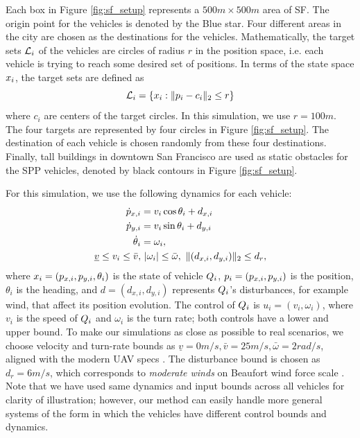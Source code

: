 Each box in Figure \ref{fig:sf_setup} represents a $500m \times 500m$ area of SF. The origin point for the vehicles is denoted by the Blue star. Four different areas in the city are chosen as the destinations for the vehicles. Mathematically, the target sets $\mathcal{L}_i$ of the vehicles are circles of radius $r$ in the position space, i.e. each vehicle is trying to reach some desired set of positions. In terms of the state space $x_i$, the target sets are defined as
\begin{equation}
\label{eq:target_sim}
\targetset_i = \{\state_i: \|\pos_i - c_i\|_2 \le r\}
\end{equation}
\noindent where $c_i$ are centers of the target circles. In this simulation, we use $r = 100m$. The four targets are represented by four circles in Figure \ref{fig:sf_setup}. The destination of each vehicle is chosen randomly from these four destinations. Finally, tall buildings in downtown San Francisco are used as static obstacles for the SPP vehicles, denoted by black contours in Figure \ref{fig:sf_setup}.

For this simulation, we use the following dynamics for each vehicle:
\begin{equation}
\label{eq:dyn_i}
\begin{aligned}
\dot{\pos}_{x,i} &= v_i \cos \theta_i + d_{x,i} \\
\dot{\pos}_{y,i} &= v_i \sin \theta_i + d_{y,i}\\
\dot{\theta}_i &= \omega_i, \\
\underline{v} \le v_i \le \bar{v}, & ~|\omega_i| \le \bar{\omega}, ~\|(d_{x,i}, d_{y,i}) \|_2 \le d_{r},
\end{aligned}
\end{equation}
\noindent where $x_i = (p_{x,i}, p_{y,i}, \theta_i)$ is the state of vehicle $Q_i$, $p_i = (p_{x,i}, p_{y,i})$ is the position, $\theta_i$ is the heading, and $d = (d_{x,i}, d_{y,i})$ represents $Q_i$'s disturbances, for example wind, that affect its position evolution. The control of $Q_i$ is $u_i = (v_i, \omega_i)$, where $v_i$ is the speed of $Q_i$ and $\omega_i$ is the turn rate; both controls have a lower and upper bound. To make our simulations as close as possible to real scenarios, we choose velocity and turn-rate bounds as $\underline{v} = 0m/s, \bar{v} = 25m/s, \bar\omega = 2 rad/s$, aligned with the modern UAV specs \cite{UAVspecs1, UAVspecs2}. The disturbance bound is chosen as $d_{r} = 6 m/s$, which corresponds to \textit{moderate winds} on Beaufort wind force scale \cite{Windscale}. Note that we have used same dynamics and input bounds across all vehicles for clarity of illustration; however, our method can easily handle more general systems of the form in which the vehicles have different control bounds and dynamics.

